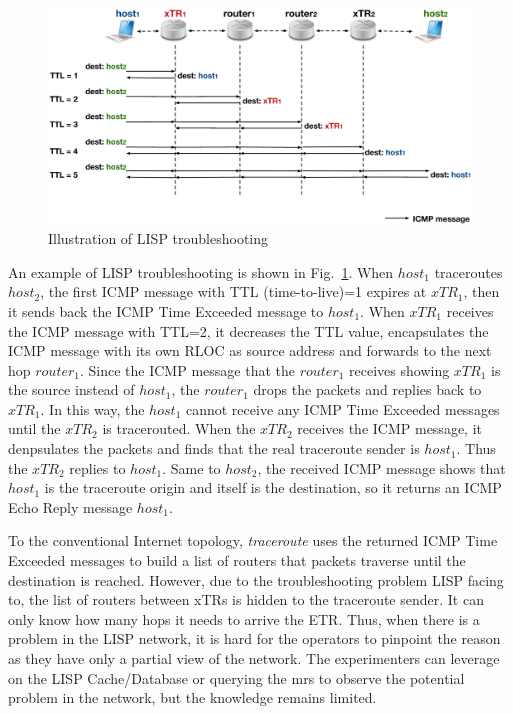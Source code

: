 \begin{figure}[!t]
	\centering
	\includegraphics[width=\textwidth]{Pics/LISP_traceroute.eps}
	\caption{Illustration of LISP troubleshooting}
	\label{Illustration_LISP_troubleshooting}
\end{figure}
An example of LISP troubleshooting is shown in Fig.~\ref{Illustration_LISP_troubleshooting}. When $host_1$ traceroutes $host_2$, the first ICMP message with TTL (time-to-live)=1 expires at $xTR_1$, then it sends back the ICMP Time Exceeded message to $host_1$. When $xTR_1$ receives the ICMP message with TTL=2, it decreases the TTL value, encapsulates the ICMP message with its own RLOC as source address and forwards to the next hop $router_1$. Since the ICMP message that the $router_1$ receives showing $xTR_1$ is the source instead of $host_1$, the $router_1$ drops the packets and replies back to $xTR_1$. In this way, the $host_1$ cannot receive any ICMP Time Exceeded messages until the $xTR_2$ is tracerouted. When the $xTR_2$ receives the ICMP message, it denpsulates the packets and finds that the real traceroute sender is $host_1$. Thus the $xTR_2$ replies to $host_1$. Same to $host_2$, the received ICMP message shows that $host_1$ is the traceroute origin and itself is the destination, so it returns an ICMP Echo Reply message $host_1$. 

To the conventional Internet topology, \emph{traceroute} uses the returned ICMP Time Exceeded messages to build a list of routers that packets traverse until the destination is reached. However, due to the troubleshooting problem LISP facing to, the list of routers between xTRs is hidden to the traceroute sender. It can only know how many hops it needs to arrive the ETR. Thus, when there is a problem in the LISP network, it is hard for the operators to pinpoint the reason as they have only a partial view of the network. The experimenters can leverage on the LISP Cache/Database or querying the \acrshort{mr}s to observe the potential problem in the network, but the knowledge remains limited. 

